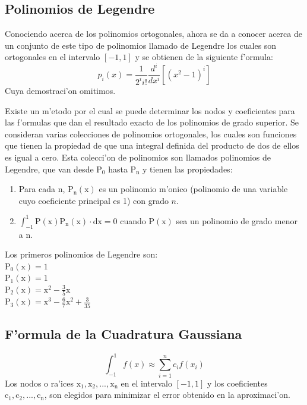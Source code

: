 \documentclass[12pt]{article}
\begin{document}
				\subsection*{Polinomios de Legendre}
					Conociendo acerca de los polinomios ortogonales, ahora se da a conocer acerca de un conjunto de este tipo de polinomios llamado de Legendre los cuales son ortogonales en el intervalo $\mathrm{[-1, 1]}$ y se obtienen de la siguiente f'ormula:		
					\begin{equation}
						p_{i}(x)=\frac{1}{2^{i}i!}\frac{d^{i}}{d x^{i}}[(x^{2}-1)^{i}]
					\end{equation}
					Cuya demostraci'on omitimos.
					
					Existe un m'etodo por el cual se puede determinar los nodos y coeficientes  para las f'ormulas que dan el resultado exacto de los polinomios de grado superior. Se consideran varias colecciones de polinomios ortogonales, los cuales son funciones que tienen la propiedad de que una integral definida del producto de dos de ellos es igual a cero. Esta colecci'on de polinomios son llamados polinomios de Legendre, que van desde $\mathrm{P_{0}}$ hasta $\mathrm{P_{n}}$ y tienen las propiedades:
					\begin{enumerate}[1.]
						\item 
						Para cada $\mathrm{n}$, $\mathrm{P_{n}(x)}$ es un polinomio m'onico (polinomio de una variable cuyo coeficiente principal es 1) con grado $n$.
						\item
						$\mathrm{\int_{-1}^{1}P(x)P_{n}(x)\cdot dx = 0}$ cuando $\mathrm{P(x)}$ sea un polinomio de grado menor a $\mathrm{n}$.
					\end{enumerate}
					
					Los primeros polinomios de Legendre son:\\
					$\mathrm{P_{0}(x)=1}$\\
					$\mathrm{P_{1}(x)=1}$\\
					$\mathrm{P_{2}(x)=x^{2}-\frac{3}{5}x}$\\
					$\mathrm{P_{3}(x)=x^{3}-\frac{6}{7}x^{2}+\frac{3}{35}}$\\	
				\subsection*{F'ormula de la Cuadratura Gaussiana}
					\begin{equation}
						\int_{-1}^{1}f(x)\approx \sum_{i=1}^{n}c_{i}f(x_{i})
					\end{equation}
					Los nodos o ra'ices $\mathrm{x_{1}, x_{2}, ..., x_{n}}$ en el intervalo $\mathrm{[-1,1]}$ y los coeficientes $\mathrm{c_{1}, c_{2}, ..., c_{n}}$, son elegidos para minimizar el error obtenido en la aproximaci'on.
					
\end{document}
